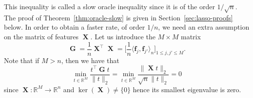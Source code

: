 \documentclass[
	fontsize=11pt, %
	twoside=false, %
	numbers=noenddot, %
]{kaobook}
\DeclareMathOperator{\bG}{{\boldsymbol G}}
\DeclareMathOperator{\bX}{{\boldsymbol X}}
\renewcommand{\bf}{{\boldsymbol f}}
\newcommand{\R}{\mathbb R}
\newcommand{\norm}[1]{\| #1 \|}
\newcommand{\inr}[1]{\langle #1 \rangle}
\begin{document}
This inequality is called a slow oracle inequality since it is of the order $1 / \sqrt{n}$.
The proof of Theorem~\ref{thm:oracle-slow} is given in Section~\ref{sec:lasso-proofs} below.
In order to obtain a faster rate, of order $1/n$, we need an extra assumption on the matrix of features $\bX$.
Let us introduce the $M \times M$ matrix 
\begin{equation*}
	\bG = \frac 1n \bX^\top \bX = 
	\Big[ \frac 1n \inr{\bf_j, \bf_{j'}}_n \Big]_{1 \leq j, j' \leq M}.
\end{equation*}
Note that if $M > n$, then we have that
\begin{equation*}
	\min_{t \in \R^M} \frac{t^\top \bG t}{\norm{t}_2} 
	= \min_{t \in \R^M} \frac{\norm{\bX t}_2}{\sqrt n \norm{t}_2} = 0
\end{equation*}
since $\bX : \R^M \rightarrow \R^n$ and $\ker(\bX) \neq \{ 0 \}$ hence its smallest eigenvalue is zero.
\end{document}
